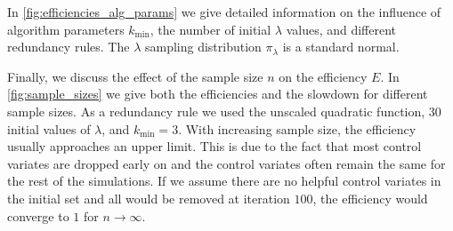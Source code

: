 In \autoref{fig:efficiencies_alg_params} we give detailed information
on the influence of
algorithm parameters $k_{\min}$, the number of initial $\lambda$ values, and
different redundancy rules.
The $\lambda$ sampling distribution $\pi_{\lambda}$ is a standard normal.

Finally, we discuss the effect of the sample size $n$ on the
efficiency $E$. In \autoref{fig:sample_sizes}
we give both the efficiencies and the slowdown for different sample sizes.
As a redundancy rule we used the unscaled quadratic function, $30$
initial values of $\lambda$,
and $k_{\min}=3$. With increasing sample size, the efficiency usually
approaches an upper limit.
This is due to the fact that most control  variates are dropped early on and
the control  variates often remain the same for the rest of the simulations.
If we assume there are no helpful control  variates in the initial set
and all would be removed at iteration $100$, the efficiency would
converge to $1$
for $n\to \infty$.

